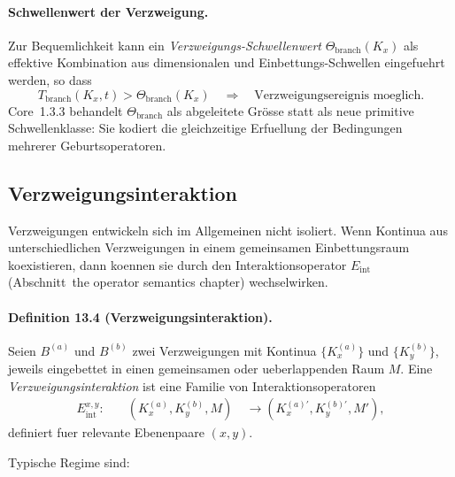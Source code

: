 \paragraph{Schwellenwert der Verzweigung.}
Zur Bequemlichkeit kann ein \emph{Verzweigungs-Schwellenwert}
\(\Theta_{\mathrm{branch}}(K_x)\) als effektive Kombination aus dimensionalen und
Einbettungs-Schwellen eingefuehrt werden, so dass
\[
  T_{\mathrm{branch}}(K_x,t) > \Theta_{\mathrm{branch}}(K_x)
  \quad\Rightarrow\quad
  \text{Verzweigungsereignis moeglich.}
\]
Core~1.3.3 behandelt \(\Theta_{\mathrm{branch}}\) als abgeleitete Grösse statt als neue
primitive Schwellenklasse: Sie kodiert die gleichzeitige Erfuellung der Bedingungen
mehrerer Geburtsoperatoren.

\subsection{Verzweigungsinteraktion}

Verzweigungen entwickeln sich im Allgemeinen nicht isoliert. Wenn Kontinua aus
unterschiedlichen Verzweigungen in einem gemeinsamen Einbettungsraum koexistieren,
dann koennen sie durch den Interaktionsoperator \(E_{\mathrm{int}}\)
(Abschnitt~the operator semantics chapter) wechselwirken.

\paragraph{Definition 13.4 (Verzweigungsinteraktion).}
Seien \(B^{(a)}\) und \(B^{(b)}\) zwei Verzweigungen mit Kontinua
\(\{K_x^{(a)}\}\) und \(\{K_y^{(b)}\}\), jeweils eingebettet in einen gemeinsamen
oder ueberlappenden Raum \(M\). Eine \emph{Verzweigungsinteraktion} ist eine
Familie von Interaktionsoperatoren
\[
\begin{aligned}
  E_{\mathrm{int}}^{x,y}:\quad
    &(K_x^{(a)}, K_y^{(b)}, M)\
    &\longrightarrow (K_x^{(a)\prime}, K_y^{(b)\prime}, M'),
\end{aligned}
\]
definiert fuer relevante Ebenenpaare \((x,y)\).

Typische Regime sind:

